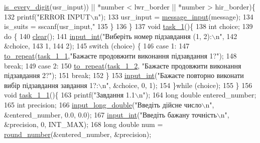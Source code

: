 \begin{DoxyCodeInclude}
{      \hyperlink{main_8c_a9594b83ee908d195f5ff508da5c23c58}{is\_every\_digit}(usr\_input)) || *number < lwr\_border || *number > hir\_border)\{
132         printf(\textcolor{stringliteral}{"ERROR INPUT\(\backslash\)n"});
133         usr\_input = \hyperlink{main_8c_a638293d509eded9d6ef7552ae1b17f2b}{message\_input}(message);
134         is\_suits = sscanf(usr\_input,\textcolor{stringliteral}{"%
135     \}
136 \}
137 \textcolor{keywordtype}{void} \hyperlink{main_8c_a2e10594dc040249a898e2880b4c64322}{task\_1}()\{
138     \textcolor{keywordtype}{int} choice;
139     \textcolor{keywordflow}{do} \{
140         \hyperlink{main_8c_aff606fb64ff89d5982673319bab86b19}{clear}();
141         \hyperlink{main_8c_a6f453bc035d85e967bd5032eca31a155}{input\_int}(\textcolor{stringliteral}{"Виберіть номер підзавдання (1, 2):\(\backslash\)n"},
142                   &choice,
143                   1,
144                   2);
145         \textcolor{keywordflow}{switch} (choice) \{
146             \textcolor{keywordflow}{case} 1:
147                 \hyperlink{main_8c_a770281b98587f9f65ca4cc75b1d061db}{to\_repeat}(\hyperlink{main_8c_a40968dfe24ede22947096429f30444a4}{task\_1\_1},\textcolor{stringliteral}{"Бажаєте продовжити виконання підзавдання 1?"});
148                 \textcolor{keywordflow}{break};
149             \textcolor{keywordflow}{case} 2:
150                 \hyperlink{main_8c_a770281b98587f9f65ca4cc75b1d061db}{to\_repeat}(\hyperlink{main_8c_a97a9145d16ec992fa06404b068bd4e18}{task\_1\_2}, \textcolor{stringliteral}{"Бажаєте продовжити виконання підзавдання 2?"});
151                 \textcolor{keywordflow}{break};
152         \}
153         \hyperlink{main_8c_a6f453bc035d85e967bd5032eca31a155}{input\_int}(\textcolor{stringliteral}{"Бажаєте повторно виконати вибір підзавдання завдання 1?:\(\backslash\)n"}, &choice, 0, 1);
154     \}\textcolor{keywordflow}{while} (choice);
155 \}
156 \textcolor{keywordtype}{void} \hyperlink{main_8c_a40968dfe24ede22947096429f30444a4}{task\_1\_1}()\{
163     printf(\textcolor{stringliteral}{"Завдання 1.1\(\backslash\)n"});
164     \textcolor{keywordtype}{long} \textcolor{keywordtype}{double} entered\_number;
165     \textcolor{keywordtype}{int} precision;
166     \hyperlink{main_8c_ac835db5eadbfefce4a51eae30806a486}{input\_long\_double}(\textcolor{stringliteral}{"Введіть дійсне число\(\backslash\)n"}, &entered\_number, 0.0, 0.0);
167     \hyperlink{main_8c_a6f453bc035d85e967bd5032eca31a155}{input\_int}(\textcolor{stringliteral}{"Введіть бажану точність\(\backslash\)n"}, &precision, 0, INT\_MAX);
168     \textcolor{keywordtype}{long} \textcolor{keywordtype}{double} num = \hyperlink{main_8c_a41a04980c21ff33f1bfb435f275011db}{round\_number}(&entered\_number, &precision);
}}
\end{DoxyCodeInclude}
